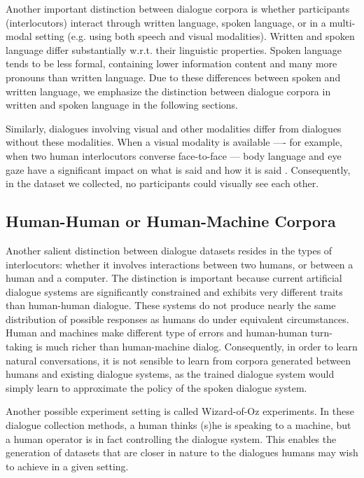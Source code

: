 \documentclass[bsc,frontabs,twoside,singlespacing,parskip,deptreport]{infthesis}     %
\begin{document}
Another important distinction between dialogue corpora is whether participants (interlocutors) interact through written language, spoken language, or in a multi-modal setting (e.g. using both speech and visual modalities). Written and spoken language differ substantially w.r.t. their linguistic properties. Spoken language tends to be less formal, containing lower information content and many more pronouns than written language\cite{carter2006cambridge,biber2001diachronic}. Due to these differences between spoken and written language, we emphasize the distinction between dialogue corpora in written and spoken language in the following sections.

Similarly, dialogues involving visual and other modalities differ from dialogues without these modalities\cite{serban2015survey,duncan1983charles}. When a visual modality is available —- for example, when two human interlocutors converse face-to-face — body language and eye gaze have a significant impact on what is said and how it is said \cite{gibson1963perception,lord1974perception,cooper1974control,chartrand1999chameleon,de2013speaker}. Consequently, in the dataset we collected, no participants could visually see each other.

\subsection{Human-Human or Human-Machine Corpora}

Another salient distinction between dialogue datasets resides in the types of interlocutors: whether it involves interactions between two humans, or between a human and a computer. The distinction is important because current artificial dialogue systems are significantly constrained and exhibits very different traits than human-human dialogue\cite{doran2003comparing}. These systems do not produce nearly the same distribution of possible responses as humans do under equivalent circumstances. Human and machines make different type of errors and human-human turn-taking is much richer than human-machine dialog\cite{williams2007partially}. Consequently, in order to learn natural conversations, it is not sensible to learn from corpora generated between humans and existing dialogue systems, as the trained dialogue system would simply learn to approximate the policy of the spoken dialogue system.

Another possible experiment setting is called Wizard-of-Oz experiments\cite{bohus2008sorry,petrik2004wizard,budzianowski2018multiwoz,eric2019multiwoz}. In these dialogue collection methods, a human thinks (s)he is speaking to a machine, but a human operator is in fact controlling the dialogue system. This enables the generation of datasets that are closer in nature to the dialogues humans may wish to achieve in a given setting. 
\end{document}
